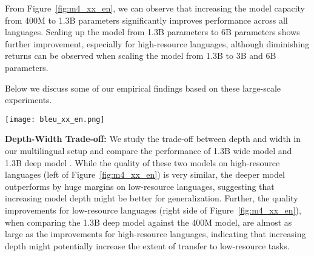 \documentclass{article}
\begin{document}
From Figure~\ref{fig:m4_xx_en}, we can observe that increasing the model capacity from 400M to 1.3B parameters significantly improves performance across all languages. Scaling up the model from 1.3B parameters to 6B parameters shows further improvement, especially for high-resource languages, although diminishing returns can be observed when scaling the model from 1.3B to 3B and 6B parameters.


Below we discuss some of our empirical findings based on these large-scale experiments. \begin{figure*}[h!]
\begin{center}
\caption{Translation quality across all languages with increasing multilingual model capacity. Languages are arranged in the order of decreasing training dataset size from left to right. , depicts the performance of a Transformer with  encoder and  decoder layers, a feed-forward hidden dimension of  and  attention heads. We notice that increasing the model capacity, from 400M params () to 1.3B (), and further, to 6B (), leads to significant quality improvements across all languages. We also notice huge quality improvements for low-resource languages (right side of the plot), when compared against bilingual baselines, highlighting the significant transfer gains resulting from training a multilingual model.}
\label{fig:m4_xx_en}
\texttt{[image: bleu\_xx\_en.png]}
\end{center}
\end{figure*}

\textbf{Depth-Width Trade-off:} We study the trade-off between depth and width in our multilingual setup and compare the performance of 1.3B wide model  and 1.3B deep model . 
While the quality of these two models on high-resource languages (left of Figure~\ref{fig:m4_xx_en}) is very similar, the deeper model outperforms by huge margins on low-resource languages, suggesting that increasing model depth might be better for generalization. Further, the quality improvements for low-resource languages (right side of Figure~\ref{fig:m4_xx_en}), when comparing the 1.3B deep model against the 400M model, are almost as large as the improvements for high-resource languages, indicating that increasing depth might potentially increase the extent of transfer to low-resource tasks.
\end{document}
